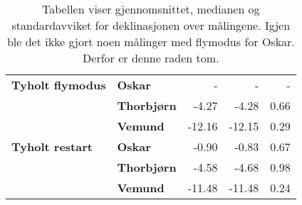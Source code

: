 \begin{table}[]
\begin{tabular}{llrrr}
    \textbf{Tyholt flymodus}                & \textbf{Oskar}                       & -                                                                           & -                                                                     & -                                                                            \\
                                            & \textbf{Thorbjørn}                   & -4.27                                                                       & -4.28                                                                 & 0.66                                                                         \\
                                            & \textbf{Vemund}                      & -12.16                                                                      & -12.15                                                                & 0.29                                                                         \\
    \rowcolor[HTML]{C0C0C0} 
    \textbf{Tyholt restart}                 & \textbf{Oskar}                       & -0.90                                                                       & -0.83                                                                 & 0.67                                                                         \\
    \rowcolor[HTML]{C0C0C0} 
                                            & \textbf{Thorbjørn}                   & -4.58                                                                       & -4.68                                                                 & 0.98                                                                         \\
    \rowcolor[HTML]{C0C0C0} 
                                            & \textbf{Vemund}                      & -11.48                                                                      & -11.48                                                                & 0.24                                                                        
    \end{tabular}
    \caption{Tabellen viser gjennomsnittet, medianen og standardavviket for deklinasjonen over målingene. Igjen ble det ikke gjort noen målinger med flymodus for Oskar. Derfor er denne raden tom.}
\end{table}